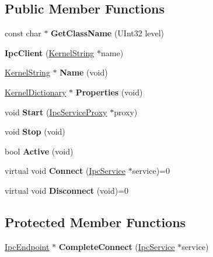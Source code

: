 \subsection*{Public Member Functions}
\begin{DoxyCompactItemize}
\item 
\mbox{\label{class_ipc_client_aeb842e37c974631ba275659fe5c831e4}} 
const char $\ast$ {\bfseries Get\+Class\+Name} (U\+Int32 level)
\item 
\mbox{\label{class_ipc_client_ad6747b7afdc214fa51c8f878268bf2af}} 
{\bfseries Ipc\+Client} (\hyperlink{class_kernel_string}{Kernel\+String} $\ast$name)
\item 
\mbox{\label{class_ipc_client_a5baa5db6bd1ae8568345bd7ba96b524e}} 
\hyperlink{class_kernel_string}{Kernel\+String} $\ast$ {\bfseries Name} (void)
\item 
\mbox{\label{class_ipc_client_ab0487fe4553c3f2f05a9d49542355f05}} 
\hyperlink{class_kernel_dictionary}{Kernel\+Dictionary} $\ast$ {\bfseries Properties} (void)
\item 
\mbox{\label{class_ipc_client_abe5591b55d806cc877fdb01038443265}} 
void {\bfseries Start} (\hyperlink{class_ipc_service_proxy}{Ipc\+Service\+Proxy} $\ast$proxy)
\item 
\mbox{\label{class_ipc_client_ad5f7decfec2ede18491e791776002615}} 
void {\bfseries Stop} (void)
\item 
\mbox{\label{class_ipc_client_ad5cc034f356c9f9c84d22245b426b788}} 
bool {\bfseries Active} (void)
\item 
\mbox{\label{class_ipc_client_a27404c55c3d45db93203b40d77639a26}} 
virtual void {\bfseries Connect} (\hyperlink{class_ipc_service}{Ipc\+Service} $\ast$service)=0
\item 
\mbox{\label{class_ipc_client_ad511bac1bba2625edae3c43dbe5075fa}} 
virtual void {\bfseries Disconnect} (void)=0
\end{DoxyCompactItemize}
\subsection*{Protected Member Functions}
\begin{DoxyCompactItemize}
\item 
\mbox{\label{class_ipc_client_a1f0a6346aac2708d48c7c555096c295b}} 
\hyperlink{class_ipc_endpoint}{Ipc\+Endpoint} $\ast$ {\bfseries Complete\+Connect} (\hyperlink{class_ipc_service}{Ipc\+Service} $\ast$service)
\end{DoxyCompactItemize}

